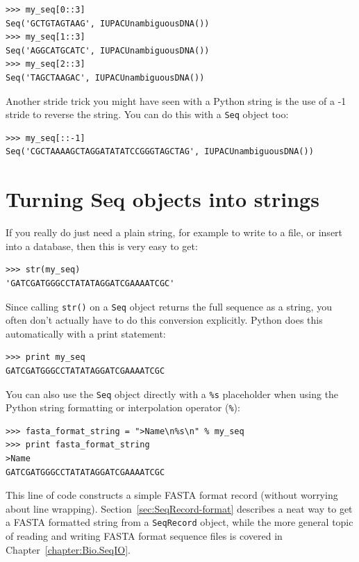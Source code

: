 \documentclass{report}
\begin{document}
\begin{verbatim}
>>> my_seq[0::3]
Seq('GCTGTAGTAAG', IUPACUnambiguousDNA())
>>> my_seq[1::3]
Seq('AGGCATGCATC', IUPACUnambiguousDNA())
>>> my_seq[2::3]
Seq('TAGCTAAGAC', IUPACUnambiguousDNA())
\end{verbatim}

Another stride trick you might have seen with a Python string is the use of a -1 stride to reverse the string.  You can do this with a \verb|Seq| object too:

\begin{verbatim}
>>> my_seq[::-1]
Seq('CGCTAAAAGCTAGGATATATCCGGGTAGCTAG', IUPACUnambiguousDNA())
\end{verbatim}

\section{Turning Seq objects into strings}
\label{sec:seq-to-string}

If you really do just need a plain string, for example to write to a file, or insert into a database, then this is very easy to get:
\begin{verbatim}
>>> str(my_seq)
'GATCGATGGGCCTATATAGGATCGAAAATCGC'
\end{verbatim}

Since calling \verb|str()| on a \verb|Seq| object returns the full sequence as a string,
you often don't actually have to do this conversion explicitly.
Python does this automatically with a print statement:
\begin{verbatim}
>>> print my_seq
GATCGATGGGCCTATATAGGATCGAAAATCGC
\end{verbatim}

You can also use the \verb|Seq| object directly with a \verb|%s| placeholder when using the Python string formatting or interpolation operator (\verb|%|):
\begin{verbatim}
>>> fasta_format_string = ">Name\n%s\n" % my_seq
>>> print fasta_format_string
>Name
GATCGATGGGCCTATATAGGATCGAAAATCGC
\end{verbatim}

\noindent This line of code constructs a simple FASTA format record (without worrying about line wrapping).
Section~\ref{sec:SeqRecord-format} describes a neat way to get a FASTA formatted
string from a \verb|SeqRecord| object, while the more general topic of reading and
writing FASTA format sequence files is covered in Chapter~\ref{chapter:Bio.SeqIO}.
\end{document}

